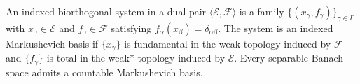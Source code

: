 An indexed biorthogonal system in a dual pair $\langle \mathcal{E}, \mathcal{F} \rangle$ is a family $\{(x_\gamma, f_\gamma)\}_{\gamma \in \Gamma}$ with $x_\gamma \in \mathcal{E}$ and $f_\gamma \in \mathcal{F}$ satisfying $f_\alpha(x_\beta) = \delta_{\alpha\beta}$. The system is an indexed Markushevich basis if $\{x_\gamma\}$ is fundamental in the weak topology induced by $\mathcal{F}$ and $\{f_\gamma\}$ is total in the weak* topology induced by $\mathcal{E}$. Every separable Banach space admits a countable Markushevich basis.
